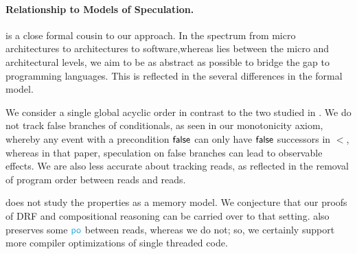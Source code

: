 


\paragraph{Relationship to Models of Speculation.}
\citet{2019-sp} is a close formal cousin to our approach.  In the spectrum
from micro architectures to architectures to software,whereas \citet{2019-sp}
lies between the micro and architectural levels, we aim to be as abstract as
possible to bridge the gap to programming languages.  This is reflected in
the several differences in the formal model.

We consider a single global acyclic order in contrast to the two studied in
\citet{2019-sp}.  We do not track false branches of conditionals, as seen in
our monotonicity axiom, whereby any event with a precondition $\mathsf{false}$ can
only have $\mathsf{false}$ successors in $\lt$, whereas in that paper, speculation on
false branches can lead to observable effects.  We are also less accurate
about tracking reads, as reflected in the removal of program order between
reads and reads.

\citet{2019-sp} does not study the properties as a memory model.  We
conjecture that our proofs of DRF and compositional reasoning can be carried
over to that setting. \citet{2019-sp} also preserves some $\rpox$ between
reads, whereas we do not; so, we certainly support more compiler
optimizations of single threaded code.


